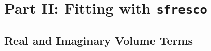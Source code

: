 \documentclass[]{scrartcl}
\begin{document}







\clearpage
\section*{Part II: Fitting with \texttt{sfresco}}

\subsection*{Real and Imaginary Volume Terms}
\end{document}
